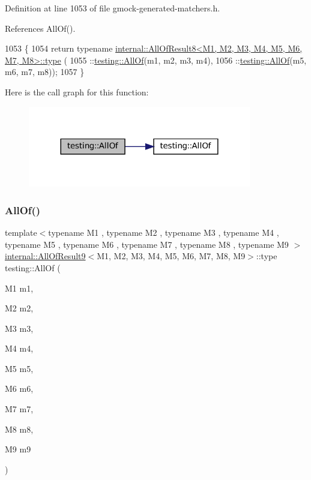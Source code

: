 Definition at line 1053 of file gmock-\/generated-\/matchers.\+h.



References All\+Of().


\begin{DoxyCode}
1053                                                               \{
1054   \textcolor{keywordflow}{return} \textcolor{keyword}{typename} \hyperlink{namespacegenerate__debs_a50bc9a7ecac9584553e089a448bcde58}{internal::AllOfResult8<M1, M2, M3, M4, M5, M6, M7, M8>::type}
      (
1055       ::\hyperlink{namespacetesting_af7618e8606c1cb45738163688944e2b7}{testing::AllOf}(m1, m2, m3, m4),
1056       ::\hyperlink{namespacetesting_af7618e8606c1cb45738163688944e2b7}{testing::AllOf}(m5, m6, m7, m8));
1057 \}
\end{DoxyCode}
Here is the call graph for this function\+:
\nopagebreak
\begin{figure}[H]
\begin{center}
\leavevmode
\includegraphics[width=276pt]{namespacetesting_a7ec0bc4eca9805e85b9b34bbbf3d3ae2_cgraph}
\end{center}
\end{figure}
\mbox{\label{namespacetesting_aaecf2bd8eb7c68b119f9b81a01942b7f}} 
\subsubsection{\texorpdfstring{All\+Of()}{AllOf()}\hspace{0.1cm}{\footnotesize\ttfamily [8/9]}}
{\footnotesize\ttfamily template$<$typename M1 , typename M2 , typename M3 , typename M4 , typename M5 , typename M6 , typename M7 , typename M8 , typename M9 $>$ \\
\hyperlink{structtesting_1_1internal_1_1AllOfResult9}{internal\+::\+All\+Of\+Result9}$<$M1, M2, M3, M4, M5, M6, M7, M8, M9$>$\+::type testing\+::\+All\+Of (\begin{DoxyParamCaption}\item[{M1}]{m1,  }\item[{M2}]{m2,  }\item[{M3}]{m3,  }\item[{M4}]{m4,  }\item[{M5}]{m5,  }\item[{M6}]{m6,  }\item[{M7}]{m7,  }\item[{M8}]{m8,  }\item[{M9}]{m9 }\end{DoxyParamCaption})\hspace{0.3cm}{\ttfamily [inline]}}



